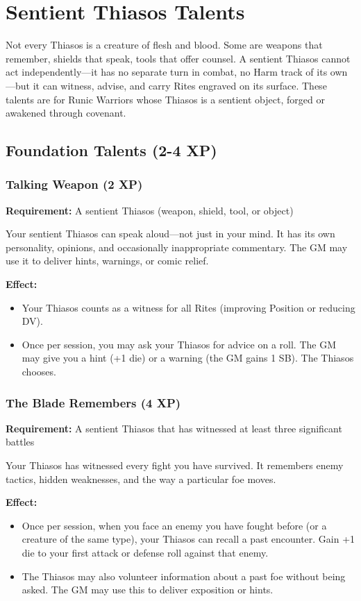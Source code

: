 \section{Sentient Thiasos Talents}

Not every Thiasos is a creature of flesh and blood. Some are weapons that remember, shields that speak, tools that offer counsel. A sentient Thiasos cannot act independently—it has no separate turn in combat, no Harm track of its own—but it can witness, advise, and carry Rites engraved on its surface. These talents are for Runic Warriors whose Thiasos is a sentient object, forged or awakened through covenant.

\subsection{Foundation Talents (2-4 XP)}

\subsubsection{Talking Weapon (2 XP)}

\textbf{Requirement:} A sentient Thiasos (weapon, shield, tool, or object)

Your sentient Thiasos can speak aloud—not just in your mind. It has its own personality, opinions, and occasionally inappropriate commentary. The GM may use it to deliver hints, warnings, or comic relief.

\textbf{Effect:}
\begin{itemize}
\item Your Thiasos counts as a witness for all Rites (improving Position or reducing DV).
\item Once per session, you may ask your Thiasos for advice on a roll. The GM may give you a hint (+1 die) or a warning (the GM gains 1 SB). The Thiasos chooses.
\end{itemize}

\subsubsection{The Blade Remembers (4 XP)}

\textbf{Requirement:} A sentient Thiasos that has witnessed at least three significant battles

Your Thiasos has witnessed every fight you have survived. It remembers enemy tactics, hidden weaknesses, and the way a particular foe moves.

\textbf{Effect:}
\begin{itemize}
\item Once per session, when you face an enemy you have fought before (or a creature of the same type), your Thiasos can recall a past encounter. Gain +1 die to your first attack or defense roll against that enemy.
\item The Thiasos may also volunteer information about a past foe without being asked. The GM may use this to deliver exposition or hints.
\end{itemize}

